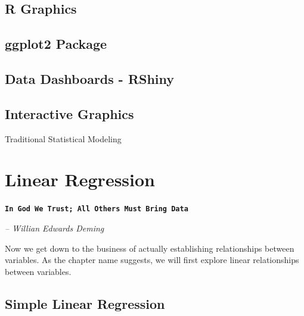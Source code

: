 \documentclass[10pt, letterpaper, twoside]{memoir}\usepackage{knitr}
\makeatletter
\newcommand{\chapterendsymbol}{
    \vspace{24pt}
    \Huge
    \hrulefill \hspace{0.1in} \hspace{0.1in} \hrulefill
    \normalsize
    }
\renewcommand\part{%
  \if@openright
    \cleardoublepage
  \else
    \clearpage
  \fi
  \thispagestyle{empty}
  \null\vfil
  \secdef\@part\@spart
  }
\makeatother
\begin{document}
\vspace{12pt}


\section{R Graphics}

\section{ggplot2 Package}

\section{Data Dashboards - RShiny}

\section{Interactive Graphics}


\chapterendsymbol



\part{Traditional Statistical Modeling}




\chapter{Linear Regression}

\begin{flushright}

\textbf{\texttt{In God We Trust; All Others Must Bring Data}}

\emph{-- Willian Edwards Deming}

\end{flushright}

\vspace{12pt}


Now we get down to the business of actually establishing relationships between variables. As the chapter name suggests, we will first explore linear relationships between variables. 

\section{Simple Linear Regression}
\end{document}
